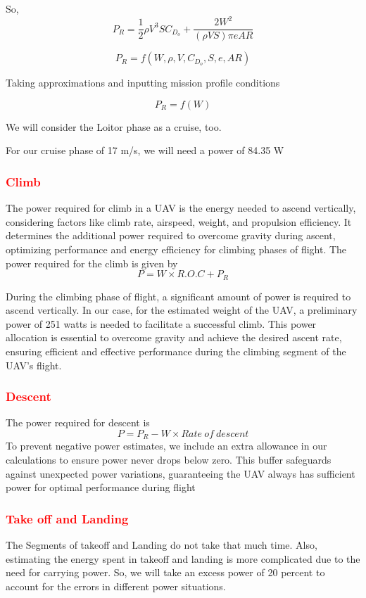 \documentclass[12 pt]{article}
\begin{document}
So, 
$$ P_R = \frac{1}{2}\rho V^3 S C_{D_o} + \frac{2 W^2}{ (\rho V S) \pi e AR} $$

$$P_R = f(W,\rho,V,C_{D_o},S,e,AR)$$

Taking approximations and inputting mission profile conditions

$$ P_R = f(W) $$

We will consider the Loitor phase as a cruise, too.

For our cruise phase of 17 m/s, we will need a power of 84.35 W 

\subsubsection{\textcolor{red}{Climb} }
The power required for climb in a UAV is the energy needed to ascend vertically, considering factors like climb rate, airspeed, weight, and propulsion efficiency. It determines the additional power required to overcome gravity during ascent, optimizing performance and energy efficiency for climbing phases of flight.
The power required for the climb is given by 
$$ P = W \times R.O.C + P_R $$

During the climbing phase of flight, a significant amount of power is required to ascend vertically. In our case, for the estimated weight of the UAV, a preliminary power of 251 watts is needed to facilitate a successful climb. This power allocation is essential to overcome gravity and achieve the desired ascent rate, ensuring efficient and effective performance during the climbing segment of the UAV's flight.

\subsubsection{\textcolor{red}{Descent}}
The power required for descent is 
$$ P = P_R - W \times Rate\: of\: descent$$
To prevent negative power estimates, we include an extra allowance in our calculations to ensure power never drops below zero. This buffer safeguards against unexpected power variations, guaranteeing the UAV always has sufficient power for optimal performance during flight

\subsubsection{\textcolor{red}{Take off and Landing}}
The Segments of takeoff and Landing do not take that much time. Also, estimating the energy spent in takeoff and landing is more complicated due to the need for carrying power. So, we will take an excess power of 20 percent to account for the errors in different power situations.
\end{document}
